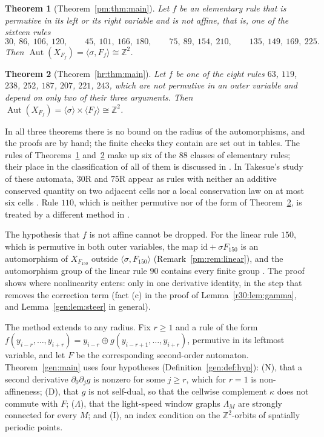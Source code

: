 \documentclass[11pt]{amsart}
\newtheorem{theorem}{Theorem}[section]
\theoremstyle{definition}
\theoremstyle{remark}
\newcommand{\Z}{\mathbb{Z}}
\newcommand{\Aut}{\operatorname{Aut}}
\newcommand{\sh}{\sigma}
\begin{document}
\begin{theorem}[Theorem~\ref{pm:thm:main}]\label{intro:thm:pm}
Let $f$ be an elementary rule that is permutive in its left or its right variable and is not affine, that is, one of the sixteen rules
\[
30,\ 86,\ 106,\ 120,\qquad 45,\ 101,\ 166,\ 180,\qquad 75,\ 89,\ 154,\ 210,\qquad 135,\ 149,\ 169,\ 225.
\]
Then $\Aut(X_{F_f})=\langle\sh,F_f\rangle\cong\Z^2$.
\end{theorem}

\begin{theorem}[Theorem~\ref{hr:thm:main}]\label{intro:thm:hr}
Let $f$ be one of the eight rules $63$, $119$, $238$, $252$, $187$, $207$, $221$, $243$, which are not permutive in an outer variable and depend on only two of their three arguments. Then $\Aut(X_{F_f})=\langle\sh\rangle\times\langle F_f\rangle\cong\Z^2$.
\end{theorem}

In all three theorems there is no bound on the radius of the automorphisms, and the proofs are by hand; the finite checks they contain are set out in tables. The rules of Theorems~\ref{intro:thm:pm} and~\ref{intro:thm:hr} make up six of the $88$ classes of elementary rules; their place in the classification of all of them is discussed in \cite{PaperD}. In Takesue's study of these automata, $30$R and $75$R appear as rules with neither an additive conserved quantity on two adjacent cells nor a local conservation law on at most six cells \cite[Section~4 and Fig.~4]{Takesue1989}. Rule $110$, which is neither permutive nor of the form of Theorem~\ref{intro:thm:hr}, is treated by a different method in \cite{PaperA}.

The hypothesis that $f$ is not affine cannot be dropped. For the linear rule $150$, which is permutive in both outer variables, the map $\mathrm{id}+\sh F_{150}$ is an automorphism of $X_{F_{150}}$ outside $\langle\sh,F_{150}\rangle$ (Remark~\ref{pm:rem:linear}), and the automorphism group of the linear rule $90$ contains every finite group \cite{PaperC}. The proof shows where nonlinearity enters: only in one derivative identity, in the step that removes the correction term (fact (c) in the proof of Lemma~\ref{r30:lem:gamma}, and Lemma~\ref{gen:lem:steer} in general).

The method extends to any radius. Fix $r\ge1$ and a rule of the form $f(y_{i-r},\dots,y_{i+r})=y_{i-r}\oplus g(y_{i-r+1},\dots,y_{i+r})$, permutive in its leftmost variable, and let $F$ be the corresponding second-order automaton. Theorem~\ref{gen:main} uses four hypotheses (Definition~\ref{gen:def:hyp}): (N), that a second derivative $\partial_0\partial_jg$ is nonzero for some $j\ge r$, which for $r=1$ is non-affineness; (D), that $g$ is not self-dual, so that the cellwise complement $\kappa$ does not commute with $F$; ($\Lambda$), that the light-speed window graphs $\Lambda_M$ are strongly connected for every $M$; and (I), an index condition on the $\Z^2$-orbits of spatially periodic points.
\end{document}
